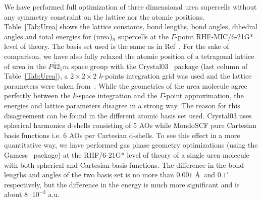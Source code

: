 \documentclass[prl,twocolumn,showpacs,twocolumngrid,superbib]{revtex4}
\begin{document}
We have performed full optimization of three dimensional urea supercells 
without any symmetry constraint on the lattice nor the atomic positions.
Table~\ref{Tab:Urea} shows the lattice constants, bond lengths, 
bond angles, dihedral angles and total energies
for (urea)$_n$ supercells at the $\Gamma$-point RHF-MIC/6-21G* level of
theory. The basis set used is the same as in Ref~\cite{RDovesi90}.
For the sake of comparison, we have also fully relaxed the atomic position of a tetragonal lattice
of urea in the $P\bar{4}2_1m$ space group with the 
{\sc Crystal03}~\cite{Crystal03} package (last column of Table~\ref{Tab:Urea}), a $2\times 2\times 2$ $k$-points 
integration grid was used and the lattice parameters were taken from~\cite{KDoll04}.
While the geometries of the urea molecule agree perfectly between the $k$-space integration
and the $\Gamma$-point approximation, the energies and lattice parameters disagree in a strong way.
The reason for this disagreement can be found in the different atomic basis set used.
{\sc Crystal03} uses spherical harmonics d-shells consisting of 5 AOs while {\sc MondoSCF} 
pure Cartesian basis functions i.e. 6 AOs per Cartesian d-shells. To see this effect in a more
quantitative way, we have performed gas phase geometry optimizations 
(using the {\sc Gamess}~\cite{gamess} package) at the RHF/6-21G* level of theory 
of a single urea molecule with both spherical and Cartesian basis functions.
The difference in the bond lengths and angles of the two basis set 
is no more than $0.001$ \AA~and $0.1^\circ$ respectively, but the
difference in the energy is much more significant and is about $8\cdot 10^{-3}$ a.u.
%
\end{document}
